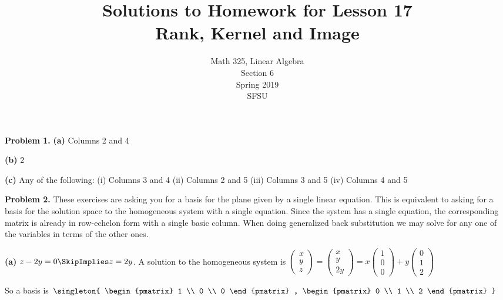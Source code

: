 \documentclass[oneside,12pt]{amsart}
\begin{document}
\title{Solutions to Homework for Lesson 17 \\ Rank, Kernel and Image}
\author{Math 325, Linear Algebra \\ Section 6\\ Spring 2019 \\ SFSU }
\date{}

\maketitle

\textbf{Problem 1.}
\textbf{(a)} Columns 2 and 4

\medskip

\textbf{(b)} 2

\medskip

\textbf{(c)} Any of the following:
(i) Columns 3 and 4
(ii) Columns 2 and 5
(iii) Columns 3 and 5
(iv) Columns 4 and 5

\bigskip


\textbf{Problem 2.} These exercises are asking you for a basis for the plane
given by a single linear equation. This is equivalent to asking for a basis
for the solution space to the homogeneous system with a single equation.
Since the system has a single equation, the corresponding matrix is already in row-echelon
form with a single basic column. When doing generalized back substitution we may
solve for any one of the variables in terms of the other ones.

\textbf{(a)} $z-2y=0 \SkipImplies z = 2y$. A solution to the homogeneous system
is
$
\begin{pmatrix}
x \\ y \\ z
\end{pmatrix}
=
\begin{pmatrix}
x \\ y \\ 2y
\end{pmatrix}
=
x
\begin{pmatrix}
1 \\ 0 \\ 0
\end{pmatrix}
+
y
\begin{pmatrix}
0 \\ 1 \\ 2
\end{pmatrix}
$

So a basis is
$
\singleton{
\begin{pmatrix}
1 \\ 0 \\ 0
\end{pmatrix}
,
\begin{pmatrix}
0 \\ 1 \\ 2
\end{pmatrix}
}
$
\end{document}
